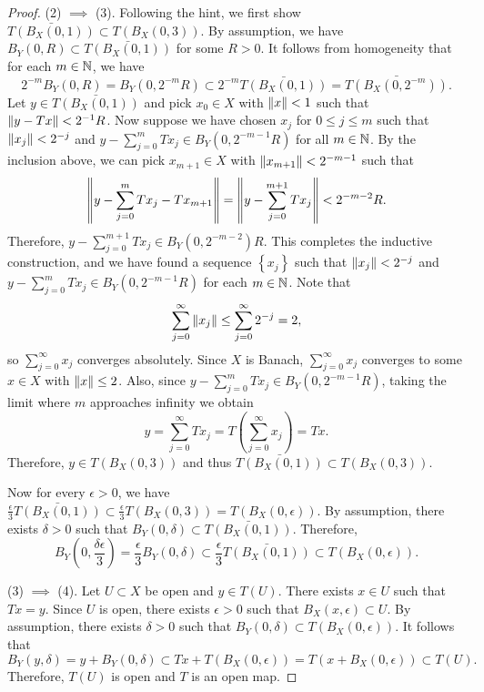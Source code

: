 \documentclass[a4paper]{article}
\begin{document}
\begin{proof}
  (2) $\implies$ (3). Following the hint, we first show 
  $\bar{T(B_X(0, 1))} \subset T(B_X(0, 3))$.
  By assumption, we have 
  $B_Y(0, R) \subset \bar{T(B_X(0, 1))}$ for some $R > 0$. 
  It follows from homogeneity that for each $m \in \mathbb{N}$, we have 
  \[
    2^{-m} B_Y(0, R) = B_Y(0, 2^{-m} R) \subset 
    2^{-m} \bar{T(B_X(0, 1))} = \bar{T(B_X(0, 2^{-m}))}.
  \]
  Let 
  $y \in \bar{T(B_X(0, 1))}$ and pick $x_0 \in X$ with 
  $\left\lVert x\right\rVert < 1$ such that $\left\lVert y - Tx\right\rVert < 2^{-1} R$. Now 
  suppose we have chosen $x_j$ for $0 \leq j \leq m$ such that 
  $\left\lVert x_j\right\rVert < 2^{-j}$ and $y - \sum_{j=0}^m T x_j \in B_Y(0, 
  2^{-m - 1} R) $ for all $m \in \mathbb{N}$. By the inclusion above, 
  we can pick $x_{m+1} \in X$ with $\left\lVert x_{m+1}\right\rVert 
  < 2^{-m-1}$ such that
  \[
  \left\lVert y - \sum_{j=0}^m T x_j - T x_{m+1}\right\rVert 
  = \left\lVert y - \sum_{j=0}^{m+1} T x_j\right\rVert < 2^{-m-2} R.
  \]
  Therefore, $y - \sum_{j=0}^{m+1} T x_j \in B_Y(0, 2^{-m-2}) R$.
  This completes the inductive construction, and we have
  found a sequence $\left\{ x_j \right\}$ such that 
  $\left\lVert x_j\right\rVert < 2^{-j}$ and 
  $y - \sum_{j=0}^m T x_j \in B_Y (0, 2^{-m-1} R)$
  for each $m \in \mathbb{N}$. Note that 
  \[
  \sum_{j=0}^\infty \left\lVert x_j\right\rVert \leq \sum_{j=0}^{\infty} 2^{-j} 
  = 2,
  \]
  so $\sum_{j=0}^\infty x_j$ converges absolutely. Since $X$ 
  is Banach, $\sum_{j=0}^\infty x_j$ converges
  to some $x \in X$ with $\left\lVert x\right\rVert \leq 2$. Also, since 
  $y - \sum_{j=0}^m T x_j \in B_Y(0, 2^{-m-1}R)$, taking the
  limit where $m$ approaches infinity we obtain 
  \[
  y = \sum_{j=0}^\infty T x_j = T \left( \sum_{j=0}^\infty x_j \right)
  = T x.
  \]
  Therefore, $y \in T(B_X(0, 3))$ and thus $\bar{T(B_X(0, 1))}
  \subset T(B_X (0,3))$.

  Now for every $\epsilon > 0$, we have 
  $\frac{\epsilon}{3} \bar{T(B_X(0, 1))} \subset \frac{\epsilon}{3}
  T(B_X(0, 3)) = T(B_X(0, \epsilon))$. By assumption, there exists
  $\delta > 0$ such that $B_Y(0, \delta) \subset \bar{T(B_X(0, 1))}$.
  Therefore,
  \[
  B_Y \left( 0, \frac{\delta \epsilon}{3} \right) = \frac{\epsilon}{3} 
  B_Y(0, \delta) \subset \frac{\epsilon}{3} \bar{T(B_X(0, 1))}
  \subset T(B_X(0, \epsilon)).
  \]

  (3) $\implies$ (4). Let $U \subset X$ be open and $y \in T(U)$.
  There exists $x \in U$ such that $T x = y$. Since $U$ is open,
  there exists $\epsilon > 0$ such that $B_X(x, \epsilon)
  \subset U$. By assumption, there exists $\delta > 0$
  such that $B_Y(0, \delta) \subset T(B_X(0, \epsilon))$.
  It follows that 
  \[
  B_Y(y, \delta) = y + B_Y(0, \delta) \subset Tx + T(B_X(0, \epsilon)) 
  = T(x + B_X(0, \epsilon)) \subset T(U).
  \]
  Therefore, $T(U)$ is open and $T$ is an open map.


\end{proof}
\end{document}
